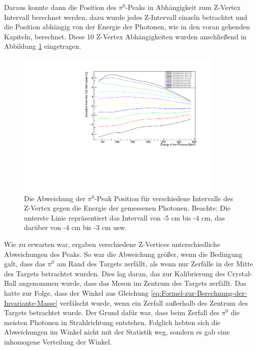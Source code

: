 \documentclass[a4paper,11pt,oneside,final,german,openbib,pdftex]{scrbook}
\begin{document}
Daraus konnte dann die Position des $\pi^0$-Peaks in Abhängigkeit zum Z-Vertex Intervall berechnet werden, dazu wurde jedes Z-Intervall einzeln betrachtet und die Position abhängig von der Energie der Photonen, wie in den voran gehenden Kapiteln, berechnet.
Diese 10 Z-Vertex Abhängigkeiten wurden anschließend in Abbildung \ref{fig:Z-Vertex-Multi-Graph} eingetragen.

\begin{figure}[h!]
	\begin{center}
		\includegraphics[width=100mm]{FullZVertexDependence}
		\caption{Die Abweichung der $\pi^0$-Peak Position für verschiedene Intervalle des Z-Vertex gegen die Energie der gemessenen Photonen. Beachte: Die unterste Linie repr\"asentiert das Intervall von -5 cm bis -4 cm, das dar\"uber von -4 cm bis -3 cm usw.}
		\label{fig:Z-Vertex-Multi-Graph}
	\end{center}
\end{figure}

Wie zu erwarten war, ergaben verschiedene Z-Vertices unterschiedliche Abweichungen des Peaks. So war die Abweichung gr\"o{\ss}er, wenn die Bedingung galt, dass das $\pi^0$ am Rand des Targets zerf\"allt, als wenn nur Zerf\"alle in der Mitte des Targets betrachtet wurden. Dies lag daran, das zur Kalibrierung des Crystal-Ball angenommen wurde, dass das Meson im Zentrum des Targets zerf\"allt. Das hatte zur Folge, dass der Winkel aus Gleichung \ref{eq:Formel-zur-Berechnung-der-Invariante-Masse} verf\"alscht wurde, wenn ein Zerfall au{\ss}erhalb des Zentrum des Targets betrachtet wurde. Der Grund daf\"ur war, dass beim Zerfall des $\pi^0$ die meisten Photonen in Strahlrichtung entstehen. Folglich hebten sich die Abweichungen im Winkel nicht mit der Statistik weg, sondern es gab eine inhomogene Verteilung der Winkel. 
  
\end{document}
